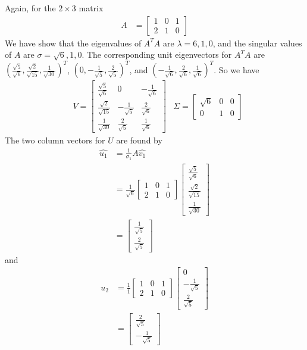 \begin{exmp}
Again, for the $2 \times 3$ matrix
\begin{align*}
A &= 
\begin{bmatrix}
1 & 0 & 1\\
2 & 1 & 0
\end{bmatrix}
\end{align*}    
We have show that the eigenvalues of $A^TA$ are $\lambda = 6,1,0$, and the singular values of $A$ are $\sigma = \sqrt{6}, 1, 0$. The corresponding unit eigenvectors for $A^TA$ are $(\frac{\sqrt{5}}{\sqrt{6}}, \frac{\sqrt{2}}{\sqrt{15}}, \frac{1}{\sqrt{30}})^T$, $(0, -\frac{1}{\sqrt{5}}, \frac{2}{\sqrt{5}})^T$, and $(-\frac{1}{\sqrt{6}}, \frac{2}{\sqrt{6}}, \frac{1}{\sqrt{6}})^T$. So we have
\begin{align*}
&V =
\begin{bmatrix}
\frac{\sqrt{5}}{\sqrt{6}} & 0 & -\frac{1}{\sqrt{6}}\\
\frac{\sqrt{2}}{\sqrt{15}} & -\frac{1}{\sqrt{5}} & \frac{2}{\sqrt{6}}\\
\frac{1}{\sqrt{30}} & \frac{2}{\sqrt{5}} & \frac{1}{\sqrt{6}}
\end{bmatrix}
&\Sigma =
\begin{bmatrix}
\sqrt{6} & 0 & 0 \\
0 & 1 & 0
\end{bmatrix}
\end{align*}
The two column vectors for $U$ are found by
\begin{align*}
\hat{u_1} &= \frac{1}{\sigma_1} A\hat{v_1} \\
&= \frac{1}{\sqrt{6}}
\begin{bmatrix}
1 & 0 & 1\\
2 & 1 & 0
\end{bmatrix}
\begin{bmatrix}
\frac{\sqrt{5}}{\sqrt{6}} \\
\frac{\sqrt{2}}{\sqrt{15}} \\
\frac{1}{\sqrt{30}}
\end{bmatrix} \\
&=
\begin{bmatrix}
\frac{1}{\sqrt{5}} \\
\frac{2}{\sqrt{5}}
\end{bmatrix}
\end{align*}
and
\begin{align*}
\hat{u_2} &= \frac{1}{1}
\begin{bmatrix}
1 & 0 & 1\\
2 & 1 & 0
\end{bmatrix}
\begin{bmatrix}
0 \\
-\frac{1}{\sqrt{5}} \\
\frac{2}{\sqrt{5}}
\end{bmatrix} \\
&= 
\begin{bmatrix}
\frac{2}{\sqrt{5}} \\
-\frac{1}{\sqrt{5}}
\end{bmatrix}
\end{align*}
\end{exmp}
